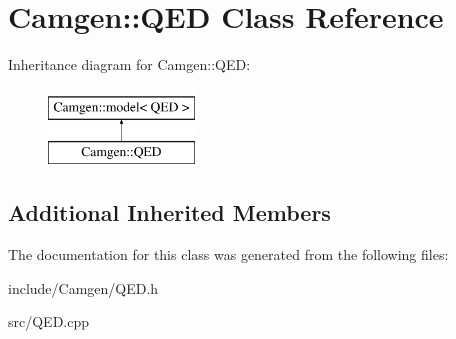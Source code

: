 \hypertarget{a00462}{}\section{Camgen\+:\+:Q\+E\+D Class Reference}
\label{a00462}
Inheritance diagram for Camgen\+:\+:Q\+E\+D\+:\begin{figure}[H]
\begin{center}
\leavevmode
\includegraphics[height=2.000000cm]{a00462}
\end{center}
\end{figure}
\subsection*{Additional Inherited Members}


The documentation for this class was generated from the following files\+:\begin{DoxyCompactItemize}
\item 
include/\+Camgen/Q\+E\+D.\+h\item 
src/Q\+E\+D.\+cpp\end{DoxyCompactItemize}
